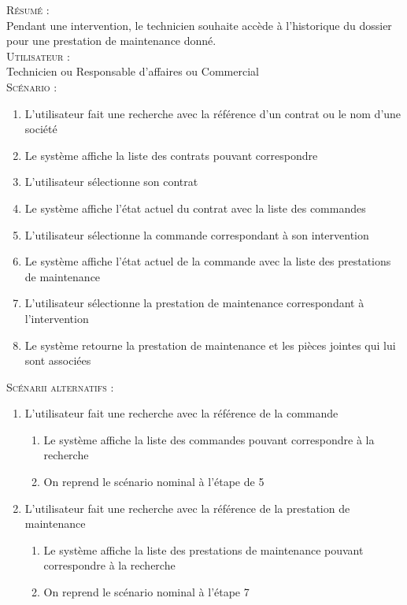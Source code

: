 \begin{shaded}
\noindent\textsc{Résumé :}\\

Pendant une intervention, le technicien souhaite accède à l’historique du dossier pour une prestation de maintenance donné. \\

\noindent\textsc{Utilisateur :}\\

Technicien ou Responsable d’affaires ou Commercial \\

\noindent\textsc{Scénario :} \\
\begin{enumerate}
    \item   L’utilisateur fait une recherche avec la référence d’un contrat ou le nom d’une société
    \item   Le système affiche la liste des contrats pouvant correspondre
    \item   L’utilisateur sélectionne son contrat
    \item   Le système affiche l’état actuel du contrat avec la liste des commandes
    \item   L’utilisateur sélectionne la commande correspondant à son intervention
    \item   Le système affiche l’état actuel de la commande avec la liste des prestations de maintenance
    \item   L’utilisateur sélectionne la prestation de maintenance correspondant à l’intervention
    \item   Le système retourne la prestation de maintenance et les pièces jointes qui lui sont associées \\
\end{enumerate}
\noindent\textsc{Scénarii alternatifs :} \\
\begin{enumerate}
    \item L’utilisateur fait une recherche avec la référence de la commande
    \begin{enumerate}
        \item Le système affiche la liste des commandes pouvant correspondre à la recherche
        \item On reprend le scénario nominal à l’étape de 5 \\
    \end{enumerate}
    \item L’utilisateur fait une recherche avec la référence de la prestation de maintenance
    \begin{enumerate}
        \item Le système affiche la liste des prestations de maintenance pouvant correspondre à la recherche
        \item On reprend le scénario nominal à l’étape 7
    \end{enumerate}
\end{enumerate}
\end{shaded}
